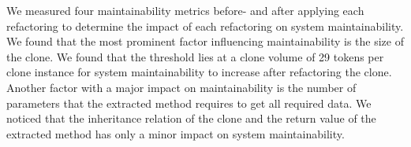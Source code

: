 \documentclass[]{IEEEtran}
\begin{document}
We measured four maintainability metrics before- and after applying each refactoring to determine the impact of each refactoring on system maintainability. We found that the most prominent factor influencing maintainability is the size of the clone. We found that the threshold lies at a clone volume of 29 tokens per clone instance for system maintainability to increase after refactoring the clone. Another factor with a major impact on maintainability is the number of parameters that the extracted method requires to get all required data. We noticed that the inheritance relation of the clone and the return value of the extracted method has only a minor impact on system maintainability.



\end{document}
